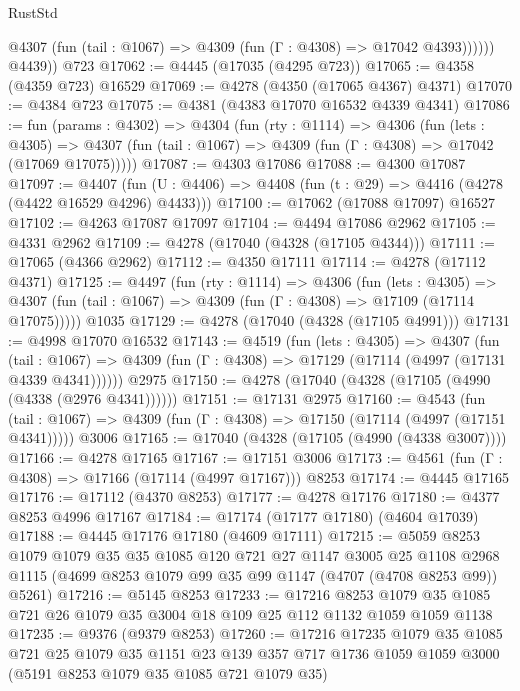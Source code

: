 \begin{lexlean}{RustStd}
\begin{coremodule}
{\begin{coremodule}
{{{{{{{{{{{{{{{{{{{{{{{{{{{{{{{{{{{              @4307 (fun (tail : @1067) => @4309 (fun (Γ : @4308) => @17042 @4393))))))
        @4439))
    @723
@17062 := @4445 (@17035 (@4295 @723))
@17065 := @4358 (@4359 @723) @16529
@17069 := @4278 (@4350 (@17065 @4367) @4371)
@17070 := @4384 @723
@17075 := @4381 (@4383 @17070 @16532 @4339 @4341)
@17086 := fun (params : @4302) =>
  @4304
    (fun (rty : @1114) =>
    @4306
      (fun (lets : @4305) =>
      @4307 (fun (tail : @1067) => @4309 (fun (Γ : @4308) => @17042 (@17069 @17075)))))
@17087 := @4303 @17086
@17088 := @4300 @17087
@17097 := @4407
    (fun (U : @4406) => @4408 (fun (t : @29) => @4416 (@4278 (@4422 @16529 @4296) @4433)))
@17100 := @17062 (@17088 @17097) @16527
@17102 := @4263 @17087 @17097
@17104 := @4494 @17086 @2962
@17105 := @4331 @2962
@17109 := @4278 (@17040 (@4328 (@17105 @4344)))
@17111 := @17065 (@4366 @2962)
@17112 := @4350 @17111
@17114 := @4278 (@17112 @4371)
@17125 := @4497
    (fun (rty : @1114) =>
    @4306
      (fun (lets : @4305) =>
      @4307 (fun (tail : @1067) => @4309 (fun (Γ : @4308) => @17109 (@17114 @17075)))))
    @1035
@17129 := @4278 (@17040 (@4328 (@17105 @4991)))
@17131 := @4998 @17070 @16532
@17143 := @4519
    (fun (lets : @4305) =>
    @4307
      (fun (tail : @1067) =>
      @4309 (fun (Γ : @4308) => @17129 (@17114 (@4997 (@17131 @4339 @4341))))))
    @2975
@17150 := @4278 (@17040 (@4328 (@17105 (@4990 (@4338 (@2976 @4341))))))
@17151 := @17131 @2975
@17160 := @4543
    (fun (tail : @1067) => @4309 (fun (Γ : @4308) => @17150 (@17114 (@4997 (@17151 @4341)))))
    @3006
@17165 := @17040 (@4328 (@17105 (@4990 (@4338 @3007))))
@17166 := @4278 @17165
@17167 := @17151 @3006
@17173 := @4561 (fun (Γ : @4308) => @17166 (@17114 (@4997 @17167))) @8253
@17174 := @4445 @17165
@17176 := @17112 (@4370 @8253)
@17177 := @4278 @17176
@17180 := @4377 @8253 @4996 @17167
@17184 := @17174 (@17177 @17180) (@4604 @17039)
@17188 := @4445 @17176 @17180 (@4609 @17111)
@17215 := @5059
    @8253
    @1079
    @1079
    @35
    @35
    @1085
    @120
    @721
    @27
    @1147
    @3005
    @25
    @1108
    @2968
    @1115
    (@4699 @8253 @1079 @99 @35 @99 @1147 (@4707 (@4708 @8253 @99)) @5261)
@17216 := @5145 @8253
@17233 := @17216
    @8253
    @1079
    @35
    @1085
    @721
    @26
    @1079
    @35
    @3004
    @18
    @109
    @25
    @112
    @1132
    @1059
    @1059
    @1138
@17235 := @9376 (@9379 @8253)
@17260 := @17216
    @17235
    @1079
    @35
    @1085
    @721
    @25
    @1079
    @35
    @1151
    @23
    @139
    @357
    @717
    @1736
    @1059
    @1059
    @3000
    (@5191 @8253 @1079 @35 @1085 @721 @1079 @35)
}}}}}}}}}}}}}}}}}}}}}}}}}}}}}}}}}}}
\end{coremodule}}
\end{coremodule}
\end{lexlean}

